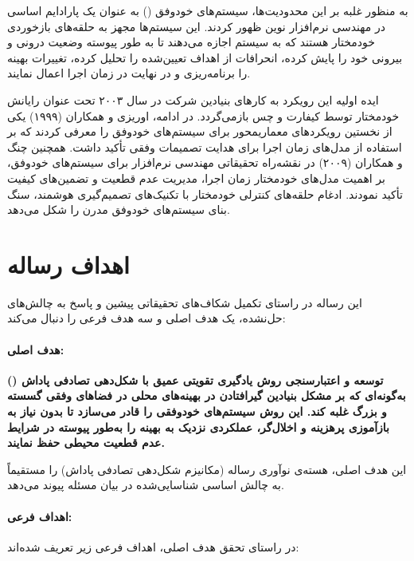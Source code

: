 \documentclass[oneside,openany,phd]{TMU-Thesis}
\begin{document}
به منظور غلبه بر این محدودیت‌ها، سیستم‌های خودوفق () به عنوان یک پارادایم اساسی در مهندسی نرم‌افزار نوین ظهور کردند. این سیستم‌ها مجهز به حلقه‌های بازخوردی خودمختار هستند که به سیستم اجازه می‌دهند تا به طور پیوسته وضعیت درونی و بیرونی خود را پایش کرده، انحرافات از اهداف تعیین‌شده را تحلیل کرده، تغییرات بهینه را برنامه‌ریزی و در نهایت در زمان اجرا اعمال نمایند. 

ایده اولیه این رویکرد به کارهای بنیادین شرکت  در سال ۲۰۰۳ تحت عنوان رایانش خودمختار توسط کیفارت و چس \cite{kephart2003vision} بازمی‌گردد. در ادامه، اوریزی و همکاران (۱۹۹۹) \cite{oreizy1999architecture} یکی از نخستین رویکردهای معماریمحور برای سیستم‌های خودوفق را معرفی کردند که بر استفاده از مدل‌های زمان اجرا برای هدایت تصمیمات وفقی تأکید داشت. همچنین چنگ و همکاران (۲۰۰۹) \cite{cheng2009software} در نقشه‌راه تحقیقاتی مهندسی نرم‌افزار برای سیستم‌های خودوفق، بر اهمیت مدل‌های خودمختار زمان اجرا، مدیریت عدم قطعیت و تضمین‌های کیفیت تأکید نمودند. ادغام حلقه‌های کنترلی خودمختار با تکنیک‌های تصمیم‌گیری هوشمند، سنگ بنای سیستم‌های خودوفق مدرن را شکل می‌دهد.

\section{اهداف رساله}

این رساله در راستای تکمیل شکاف‌های تحقیقاتی پیشین \cite{cheng2009software} و پاسخ به چالش‌های حل‌نشده، یک هدف اصلی و سه هدف فرعی را دنبال می‌کند:

\paragraph{هدف اصلی:}
\textbf{توسعه و اعتبارسنجی روش یادگیری تقویتی عمیق با شکل‌دهی تصادفی پاداش () به‌گونه‌ای که بر مشکل بنیادین گیرافتادن در بهینه‌های محلی در فضاهای وفقی گسسته و بزرگ غلبه کند. این روش سیستم‌های خودوفقی را قادر می‌سازد تا بدون نیاز به بازآموزی پرهزینه و اخلال‌گر، عملکردی نزدیک به بهینه را به‌طور پیوسته در شرایط عدم قطعیت محیطی حفظ نمایند.}

این هدف اصلی، هسته‌ی نوآوری رساله (مکانیزم شکل‌دهی تصادفی پاداش) را مستقیماً به چالش اساسی شناسایی‌شده در بیان مسئله پیوند می‌دهد.

\paragraph{اهداف فرعی:}
در راستای تحقق هدف اصلی، اهداف فرعی زیر تعریف شده‌اند:
\end{document}
